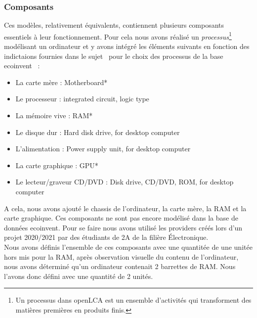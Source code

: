 \documentclass[12pt,a4paper]{paper}
\begin{document}
\subsubsection{Composants}
Ces modèles, relativement équivalents, contiennent plusieurs composants essentiels à leur fonctionnement. Pour cela nous avons réalisé un \textit{processus}\footnote{Un processus dans openLCA est un ensemble d'activités qui transforment des matières premières en produits finis.} modélisant un ordinateur et y avons intégré les éléments suivants en fonction des indictaions fournies dans le sujet~\cite{TP2_ACV_ENSEIRB-MATMECA} pour le choix des processus de la base ecoinvent~\cite{ecoinvent2024} :
\begin{itemize}
    \item La carte mère : Motherboard*
    \item Le processeur : integrated circuit, logic type
    \item La mémoire vive : RAM*
    \item Le disque dur : Hard disk drive, for desktop computer
    \item L'alimentation : Power supply unit, for desktop computer
    \item La carte graphique : GPU*
    \item Le lecteur/graveur CD/DVD : Disk drive, CD/DVD, ROM, for desktop computer
\end{itemize}
A cela, nous avons ajouté le chassis de l'ordinateur, la carte mère, la RAM et la carte graphique. Ces composants ne sont pas encore modélisé dans la base de données ecoinvent. Pour se faire nous avons utilisé les providers créés lors d’un projet 2020/2021 par des étudiants de 2A de la filière Électronique.\\
Nous avons définis l'ensemble de ces composants avec une quantitée de une unitée hors mis pour la RAM, après observation visuelle du contenu de l'ordinateur, nous avons déterminé qu'un ordinateur contenait 2 barrettes de RAM. Nous l'avons donc défini avec une quantité de 2 unités.

\end{document}

